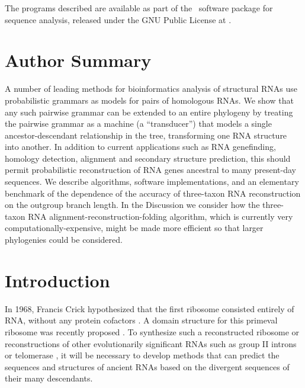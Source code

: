 \documentclass[10pt]{article}
\begin{document}
The programs described are available
as part of the \dart\ software package for sequence analysis,
released under the GNU Public License at
\darturl.


\newpage
\section*{Author Summary}

A number of leading methods for bioinformatics analysis of structural
RNAs use probabilistic grammars as models for pairs of homologous
RNAs.  We show that any such pairwise grammar can be extended to an
entire phylogeny by treating the pairwise grammar as a machine (a
``transducer'') that models a single ancestor-descendant relationship
in the tree, transforming one RNA structure into another.  In addition
to current applications such as RNA genefinding, homology detection,
alignment and secondary structure prediction, this should permit
probabilistic reconstruction of RNA genes ancestral to many
present-day sequences.  We describe algorithms, software
implementations, and an elementary benchmark of the dependence of the
accuracy of three-taxon RNA reconstruction on the outgroup branch
length.  In the Discussion we consider how the three-taxon RNA
alignment-reconstruction-folding algorithm, which is currently very
computationally-expensive, might be made more efficient so that larger
phylogenies could be considered.

\newpage
\section*{Introduction}
In 1968, Francis Crick hypothesized that the first ribosome consisted entirely of RNA, without any protein cofactors \cite{Crick68}.
A domain structure for this primeval ribosome was recently proposed \cite{SmithEtAl2008}.
To synthesize such a reconstructed ribosome or reconstructions of other evolutionarily significant RNAs
such as group II introns \cite{LehmannSchmidt2003} or telomerase \cite{AntalEtAl2002},
it will be necessary to develop methods that can predict the sequences
and structures of ancient RNAs
based on the divergent sequences of their many descendants.
\end{document}
